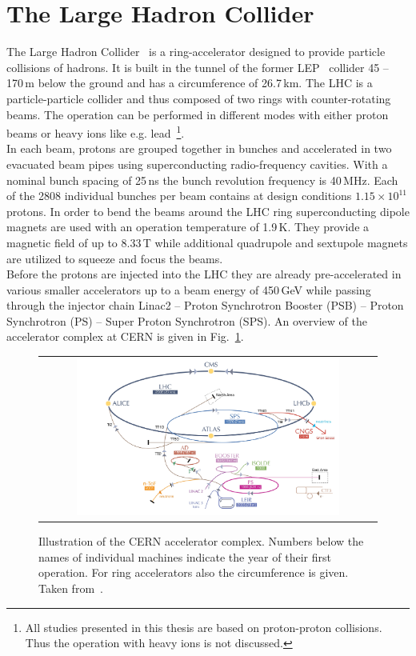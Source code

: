 \section{The Large Hadron Collider}
\label{sec:lhc}
The Large Hadron Collider~\cite{Bruning:782076, 1748-0221-3-08-S08001} is a ring-accelerator designed to provide particle collisions of hadrons. It is built in the tunnel of the former LEP~\cite{LEPdesign} collider 45 -- 170\,m below the ground and has a circumference of 26.7\,km. The LHC is a particle-particle collider and thus composed of two rings with counter-rotating beams. The operation can be performed in different modes with either proton beams or heavy ions like e.g. lead~\footnote{All studies presented in this thesis are based on proton-proton collisions. Thus the operation with heavy ions is not discussed.}. \\
In each beam, protons are grouped together in bunches and accelerated in two evacuated beam pipes using superconducting radio-frequency cavities. With a nominal bunch spacing of 25\,ns the bunch revolution frequency is 40\,MHz. Each of the 2808 individual bunches per beam contains at design conditions $1.15 \times 10^{11}$ protons. In order to bend the beams around the LHC ring superconducting dipole magnets are used with an operation temperature of 1.9\,K. They provide a magnetic field of up to 8.33\,T while additional quadrupole and sextupole magnets are utilized to squeeze and focus the beams.\\  
Before the protons are injected into the LHC they are already pre-accelerated in various smaller accelerators up to a beam energy of 450\,GeV while passing through the injector chain Linac2 -- Proton Synchrotron Booster (PSB) -- Proton Synchrotron (PS) -- Super Proton Synchrotron (SPS). An overview of the accelerator complex at CERN is given in Fig.~\ref{fig:AccComplex}.
\begin{figure}[!tp]
  \centering
  \begin{tabular}{c}
    \includegraphics[width=0.8\textwidth]{figures/AcceleratorComplex.jpg}
  \end{tabular}
  \caption{Illustration of the CERN accelerator complex. Numbers below the names of individual machines indicate the year of their first operation. For ring accelerators also the circumference is given. Taken from~\cite{Christiane:1260465}.}
  \label{fig:AccComplex}
\end{figure}
